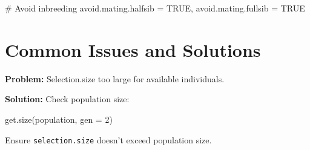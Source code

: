 \documentclass[
  letterpaper,
]{book}
\newenvironment{Shaded}{\begin{snugshade}}{\end{snugshade}}
\newcommand{\AttributeTok}[1]{\textcolor[rgb]{0.40,0.45,0.13}{#1}}
\newcommand{\CommentTok}[1]{\textcolor[rgb]{0.37,0.37,0.37}{#1}}
\newcommand{\ConstantTok}[1]{\textcolor[rgb]{0.56,0.35,0.01}{#1}}
\newcommand{\DecValTok}[1]{\textcolor[rgb]{0.68,0.00,0.00}{#1}}
\newcommand{\FunctionTok}[1]{\textcolor[rgb]{0.28,0.35,0.67}{#1}}
\newcommand{\NormalTok}[1]{\textcolor[rgb]{0.00,0.23,0.31}{#1}}
\newcommand{\OtherTok}[1]{\textcolor[rgb]{0.00,0.23,0.31}{#1}}
\begin{document}
\begin{Shaded}
\begin{Highlighting}[]
\CommentTok{\# Avoid inbreeding}
\NormalTok{avoid.mating.halfsib }\OtherTok{=} \ConstantTok{TRUE}\NormalTok{,}
\NormalTok{avoid.mating.fullsib }\OtherTok{=} \ConstantTok{TRUE}
\end{Highlighting}
\end{Shaded}

\section{Common Issues and Solutions}\label{common-issues-and-solutions}

\begin{tcolorbox}[enhanced jigsaw, breakable, coltitle=black, opacitybacktitle=0.6, left=2mm, colframe=quarto-callout-warning-color-frame, toprule=.15mm, colback=white, bottomtitle=1mm, colbacktitle=quarto-callout-warning-color!10!white, opacityback=0, leftrule=.75mm, toptitle=1mm, rightrule=.15mm, arc=.35mm, titlerule=0mm, title=\textcolor{quarto-callout-warning-color}{\faExclamationTriangle}\hspace{0.5em}{``Not enough males/females''}, bottomrule=.15mm]

\textbf{Problem:} Selection.size too large for available individuals.

\textbf{Solution:} Check population size:

\begin{Shaded}
\begin{Highlighting}[]
\FunctionTok{get.size}\NormalTok{(population, }\AttributeTok{gen =} \DecValTok{2}\NormalTok{)}
\end{Highlighting}
\end{Shaded}

Ensure \texttt{selection.size} doesn't exceed population size.

\end{tcolorbox}
\end{document}
